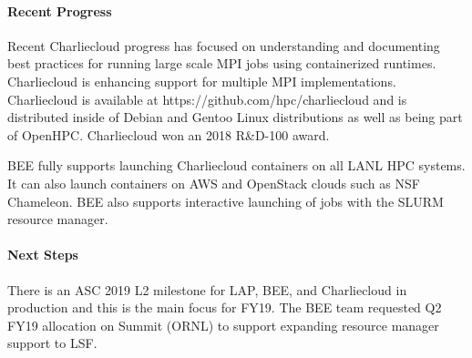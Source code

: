 \paragraph{Recent Progress}
%
Recent Charliecloud progress has focused on understanding and documenting best
practices for running large scale MPI jobs using containerized runtimes.
Charliecloud is enhancing support for multiple MPI implementations.
Charliecloud is available at https://github.com/hpc/charliecloud and is
distributed inside of Debian and Gentoo Linux distributions as well as being
part of OpenHPC.  Charliecloud won an 2018 R\&D-100 award.

BEE fully supports launching Charliecloud containers on all LANL HPC systems.
It can also launch containers on AWS and OpenStack clouds such as NSF
Chameleon.  BEE also supports interactive launching of jobs with the SLURM
resource manager.

\paragraph{Next Steps}
There is an ASC 2019 L2 milestone for LAP, BEE, and Charliecloud in production
and this is the main focus for FY19.  The BEE team requested Q2 FY19 allocation
on Summit (ORNL) to support expanding resource manager support to LSF.
